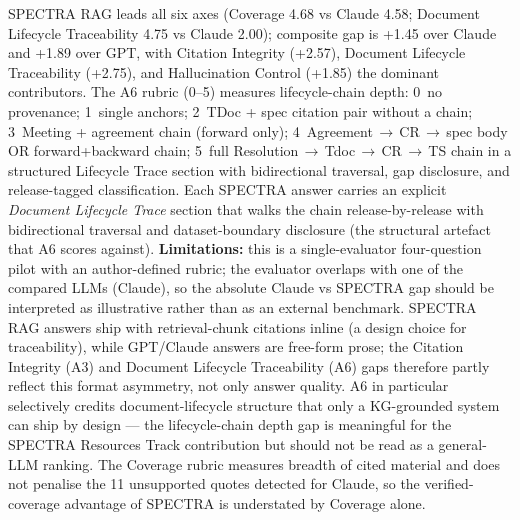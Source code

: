 SPECTRA RAG leads all six axes (Coverage 4.68 vs Claude 4.58; Document Lifecycle Traceability 4.75 vs Claude 2.00); composite gap is +1.45 over Claude and +1.89 over GPT, with Citation Integrity (+2.57), Document Lifecycle Traceability (+2.75), and Hallucination Control (+1.85) the dominant contributors. The A6 rubric (0--5) measures lifecycle-chain depth: 0~no provenance; 1~single anchors; 2~TDoc + spec citation pair without a chain; 3~Meeting + agreement chain (forward only); 4~Agreement\,$\to$\,CR\,$\to$\,spec body OR forward+backward chain; 5~full Resolution\,$\to$\,Tdoc\,$\to$\,CR\,$\to$\,TS chain in a structured Lifecycle Trace section with bidirectional traversal, gap disclosure, and release-tagged classification. Each SPECTRA answer carries an explicit \emph{Document Lifecycle Trace} section that walks the chain release-by-release with bidirectional traversal and dataset-boundary disclosure (the structural artefact that A6 scores against). \textbf{Limitations:} this is a single-evaluator four-question pilot with an author-defined rubric; the evaluator overlaps with one of the compared LLMs (Claude), so the absolute Claude vs SPECTRA gap should be interpreted as illustrative rather than as an external benchmark. SPECTRA RAG answers ship with retrieval-chunk citations inline (a design choice for traceability), while GPT/Claude answers are free-form prose; the Citation Integrity (A3) and Document Lifecycle Traceability (A6) gaps therefore partly reflect this format asymmetry, not only answer quality. A6 in particular selectively credits document-lifecycle structure that only a KG-grounded system can ship by design --- the lifecycle-chain depth gap is meaningful for the SPECTRA Resources Track contribution but should not be read as a general-LLM ranking. The Coverage rubric measures breadth of cited material and does not penalise the 11 unsupported quotes detected for Claude, so the verified-coverage advantage of SPECTRA is understated by Coverage alone.

